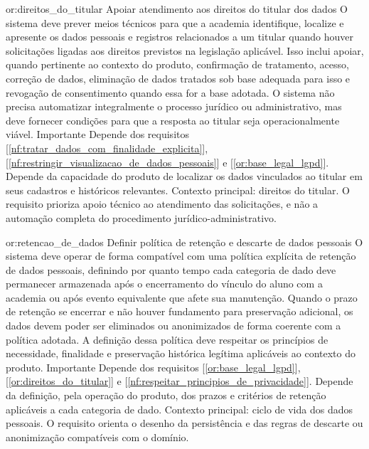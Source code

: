 \reqoutro
{or:direitos_do_titular}
{Apoiar atendimento aos direitos do titular dos dados}
{O sistema deve prever meios técnicos para que a academia identifique, localize e apresente os dados pessoais e registros relacionados a um titular quando houver solicitações ligadas aos direitos previstos na legislação aplicável. Isso inclui apoiar, quando pertinente ao contexto do produto, confirmação de tratamento, acesso, correção de dados, eliminação de dados tratados sob base adequada para isso e revogação de consentimento quando essa for a base adotada. O sistema não precisa automatizar integralmente o processo jurídico ou administrativo, mas deve fornecer condições para que a resposta ao titular seja operacionalmente viável.}
{Importante}
{Depende dos requisitos [\ref{nf:tratar_dados_com_finalidade_explicita}], [\ref{nf:restringir_visualizacao_de_dados_pessoais}] e [\ref{or:base_legal_lgpd}]. Depende da capacidade do produto de localizar os dados vinculados ao titular em seus cadastros e históricos relevantes.}
{Contexto principal: direitos do titular. O requisito prioriza apoio técnico ao atendimento das solicitações, e não a automação completa do procedimento jurídico-administrativo.}

\reqoutro
{or:retencao_de_dados}
{Definir política de retenção e descarte de dados pessoais}
{O sistema deve operar de forma compatível com uma política explícita de retenção de dados pessoais, definindo por quanto tempo cada categoria de dado deve permanecer armazenada após o encerramento do vínculo do aluno com a academia ou após evento equivalente que afete sua manutenção. Quando o prazo de retenção se encerrar e não houver fundamento para preservação adicional, os dados devem poder ser eliminados ou anonimizados de forma coerente com a política adotada. A definição dessa política deve respeitar os princípios de necessidade, finalidade e preservação histórica legítima aplicáveis ao contexto do produto.}
{Importante}
{Depende dos requisitos [\ref{or:base_legal_lgpd}], [\ref{or:direitos_do_titular}] e [\ref{nf:respeitar_principios_de_privacidade}]. Depende da definição, pela operação do produto, dos prazos e critérios de retenção aplicáveis a cada categoria de dado.}
{Contexto principal: ciclo de vida dos dados pessoais. O requisito orienta o desenho da persistência e das regras de descarte ou anonimização compatíveis com o domínio.}

